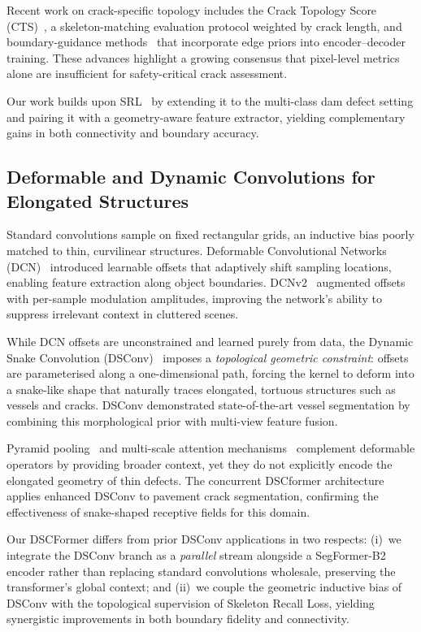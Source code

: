 Recent work on crack-specific topology includes the Crack Topology Score (CTS)~\cite{pantoja2024cracktopology}, a skeleton-matching evaluation protocol weighted by crack length, and boundary-guidance methods~\cite{wang2024dsctopology} that incorporate edge priors into encoder--decoder training.
These advances highlight a growing consensus that pixel-level metrics alone are insufficient for safety-critical crack assessment.

Our work builds upon SRL~\cite{shit2024skeleton} by extending it to the multi-class dam defect setting and pairing it with a geometry-aware feature extractor, yielding complementary gains in both connectivity and boundary accuracy.

\subsection{Deformable and Dynamic Convolutions for Elongated Structures}
\label{sec:related:deformable}

Standard convolutions sample on fixed rectangular grids, an inductive bias poorly matched to thin, curvilinear structures.
Deformable Convolutional Networks (DCN)~\cite{dai2017deformable} introduced learnable offsets that adaptively shift sampling locations, enabling feature extraction along object boundaries.
DCNv2~\cite{zhu2019deformable} augmented offsets with per-sample modulation amplitudes, improving the network's ability to suppress irrelevant context in cluttered scenes.

While DCN offsets are unconstrained and learned purely from data, the Dynamic Snake Convolution (DSConv)~\cite{qi2023dynamic} imposes a \emph{topological geometric constraint}: offsets are parameterised along a one-dimensional path, forcing the kernel to deform into a snake-like shape that naturally traces elongated, tortuous structures such as vessels and cracks.
DSConv demonstrated state-of-the-art vessel segmentation by combining this morphological prior with multi-view feature fusion.

Pyramid pooling~\cite{zhao2017pspnet} and multi-scale attention mechanisms~\cite{liu2021swin} complement deformable operators by providing broader context, yet they do not explicitly encode the elongated geometry of thin defects.
The concurrent DSCformer architecture applies enhanced DSConv to pavement crack segmentation, confirming the effectiveness of snake-shaped receptive fields for this domain.

Our DSCFormer differs from prior DSConv applications in two respects: (i)~we integrate the DSConv branch as a \emph{parallel} stream alongside a SegFormer-B2 encoder rather than replacing standard convolutions wholesale, preserving the transformer's global context; and (ii)~we couple the geometric inductive bias of DSConv with the topological supervision of Skeleton Recall Loss, yielding synergistic improvements in both boundary fidelity and connectivity.
